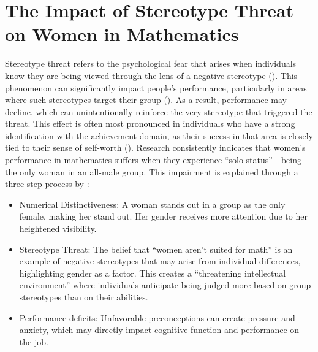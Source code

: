 \section{The Impact of Stereotype Threat on Women in Mathematics}
Stereotype threat refers to the psychological fear that arises when individuals know they are being viewed through the lens of a negative stereotype (\cite{Beeghly2015}). This phenomenon can significantly impact people's performance, particularly in areas where such stereotypes target their group (\cite{Schmader2008}). As a result, performance may decline, which can unintentionally reinforce the very stereotype that triggered the threat. This effect is often most pronounced in individuals who have a strong identification with the achievement domain, as their success in that area is closely tied to their sense of self-worth (\cite{CROCKER199989}).
Research consistently indicates that women's performance in mathematics suffers when they experience ``solo status''—being the only woman in an all-male group. This impairment is explained through a three-step process by \textcite{Beat}:
\begin{itemize}
    \item Numerical Distinctiveness: A woman stands out in a group as the only female, making her stand out. Her gender receives more attention due to her heightened visibility.
    \item Stereotype Threat: The belief that ``women aren't suited for math'' is an example of negative stereotypes that may arise from individual differences, highlighting gender as a factor. This creates a ``threatening intellectual environment'' where individuals anticipate being judged more based on group stereotypes than on their abilities.
    \item Performance deficits: Unfavorable preconceptions can create pressure and anxiety, which may directly impact cognitive function and performance on the job.
\end{itemize}
